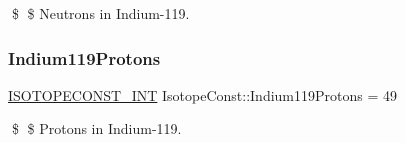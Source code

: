 \$ \$ Neutrons in Indium-\/119. \mbox{\label{group___isotope_const-_indium-_in119_gaf3a9194ca6aed1cae3d97907206c1e1a}} 
\subsubsection{\texorpdfstring{Indium119\+Protons}{Indium119Protons}}
{\footnotesize\ttfamily \mbox{\hyperlink{group___isotope_const-_macros_ga5f18360b3e99483a35c32d789e62621c}{I\+S\+O\+T\+O\+P\+E\+C\+O\+N\+S\+T\+\_\+\+I\+NT}} Isotope\+Const\+::\+Indium119\+Protons = 49}

\$ \$ Protons in Indium-\/119. 